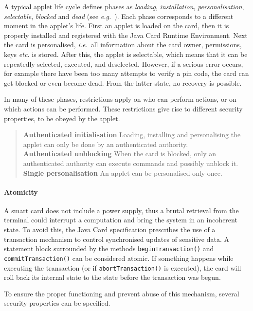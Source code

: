 A typical applet life cycle defines phases as {\it loading},
{\it installation}, {\it personalisation}, {\it selectable},
{\it blocked} and {\it dead}
(see \emph{e.g.}~\/\cite{MarletLM01}).  Each phase corresponds to a
different moment in the applet's life. First an applet is loaded on
the card, then it is properly installed and registered with the Java
Card Runtime Environment. Next the card is personalised,
\emph{i.e.}~all information about the card owner, permissions, keys
\emph{etc.} is stored. After this, the applet is selectable, which means
that it can be repeatedly selected, executed, and deselected. However,
if a serious error occurs, for example there
have been too many attempts to verify a pin code, the card can get
blocked or even become dead. From the latter state, no recovery is
possible.

In many of these phases, restrictions apply on who can perform
actions, or on which actions can be performed. These restrictions give
rise to different security properties, to be obeyed by the applet.

\begin{quote}
\textbf{Authenticated initialisation} Loading, installing and 
personalising the applet can only be done by an authenticated
authority.\smallskip\\
\textbf{Authenticated unblocking} When the card is blocked,
only an authenticated authority can execute commands and possibly
unblock it.\smallskip\\
\textbf{Single personalisation} An applet can be
personalised only once.
\end{quote}


\paragraph {Atomicity}

A smart card does not include a power supply, thus a brutal retrieval
from the terminal could interrupt a computation and bring the system in
an incoherent state. To avoid this, the Java Card
specification prescribes the use of a transaction mechanism to
control synchronised updates of sensitive data. A 
statement block surrounded by the methods \texttt{beginTransaction()} and
\texttt{commitTransaction()} can be considered atomic.
If something happens while executing the transaction (or if
\texttt{abortTransaction()} is executed), the card will
roll back its internal state to the state before the transaction was
begun.

To ensure the proper functioning and prevent abuse of this mechanism,
several security properties can be specified.

